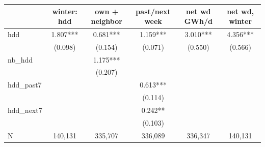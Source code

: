 \begin{tabular}{lccccc}
\hline
 & winter: hdd & own + neighbor & past/next week & net wd GWh/d & net wd, winter \\
\hline
hdd & 1.807*** & 0.681*** & 1.159*** & 3.010*** & 4.356*** \\
 & (0.098) & (0.154) & (0.071) & (0.550) & (0.566) \\
nb\_hdd &  & 1.175*** &  &  &  \\
 &  & (0.207) &  &  &  \\
hdd\_past7 &  &  & 0.613*** &  &  \\
 &  &  & (0.114) &  &  \\
hdd\_next7 &  &  & 0.242** &  &  \\
 &  &  & (0.103) &  &  \\
\hline
N & 140,131 & 335,707 & 336,089 & 336,347 & 140,131 \\
\hline
\end{tabular}
